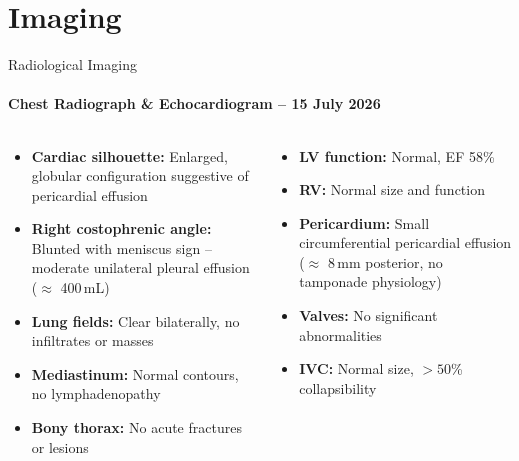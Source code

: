\section{Imaging}
\begin{frame}{Radiological Imaging}
  \framesubtitle{Chest Radiograph \& Echocardiogram -- 15 July 2026}

  \begin{columns}[T]
    \begin{tcolorbox}[infobox,title={\faSearch\hspace{4pt}Chest X-Ray (PA \& Lateral)}]
      \small
      \begin{itemize}
        \item \textbf{Cardiac silhouette:} Enlarged, globular configuration suggestive of pericardial effusion
        \item \textbf{Right costophrenic angle:} Blunted with meniscus sign -- moderate unilateral pleural effusion ($\approx$ 400\,mL)
        \item \textbf{Lung fields:} Clear bilaterally, no infiltrates or masses
        \item \textbf{Mediastinum:} Normal contours, no lymphadenopathy
        \item \textbf{Bony thorax:} No acute fractures or lesions
      \end{itemize}
    \end{tcolorbox}

    \begin{tcolorbox}[infobox,title={\faHeart\hspace{4pt}Transthoracic Echocardiogram}]
      \small
      \begin{itemize}
        \item \textbf{LV function:} Normal, EF 58\%
        \item \textbf{RV:} Normal size and function
        \item \textbf{Pericardium:} Small circumferential pericardial effusion ($\approx$ 8\,mm posterior, no tamponade physiology)
        \item \textbf{Valves:} No significant abnormalities
        \item \textbf{IVC:} Normal size, $>50$\% collapsibility
      \end{itemize}
    \end{tcolorbox}
  \end{columns}

  \vspace{0.4cm}


\end{frame}
